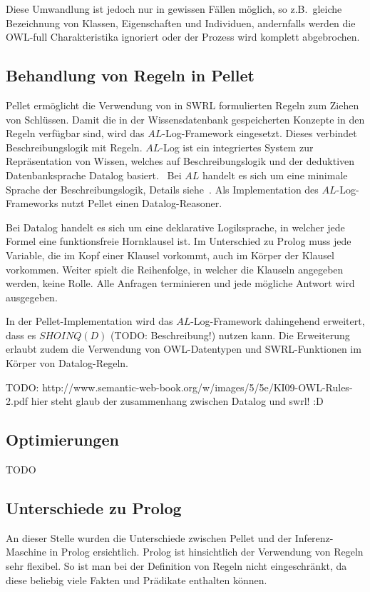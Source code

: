 Diese Umwandlung ist jedoch nur in gewissen Fällen möglich, so z.B.\ gleiche Bezeichnung von Klassen, Eigenschaften und Individuen, andernfalls werden die OWL-full Charakteristika ignoriert oder der Prozess wird komplett abgebrochen.

\subsection{Behandlung von Regeln in Pellet}
\label{subsection:inferenz_pellet_swrl}
Pellet ermöglicht die Verwendung von in SWRL formulierten Regeln zum Ziehen von Schlüssen. Damit die in der Wissensdatenbank gespeicherten Konzepte in den Regeln verfügbar sind, wird das $AL$-Log-Framework eingesetzt. Dieses verbindet Beschreibungslogik mit Regeln. $AL$-Log ist ein integriertes System zur Repräsentation von Wissen, welches auf Beschreibungslogik und der deduktiven Datenbanksprache Datalog basiert.~\cite{allog} Bei $AL$ handelt es sich um eine minimale Sprache der Beschreibungslogik, Details siehe~\cite[Seite 51]{dl:baader2003}. Als Implementation des $AL$-Log-Frameworks nutzt Pellet einen Datalog-Reasoner. 

Bei Datalog handelt es sich um eine deklarative Logiksprache, in welcher jede Formel eine funktionsfreie Hornklausel ist. Im Unterschied zu Prolog muss jede Variable, die im Kopf einer Klausel vorkommt, auch im Körper der Klausel vorkommen. Weiter spielt die Reihenfolge, in welcher die Klauseln angegeben werden, keine Rolle. Alle Anfragen terminieren und jede mögliche Antwort wird ausgegeben.~\cite{datalog}

In der Pellet-Implementation wird das $AL$-Log-Framework dahingehend erweitert, dass es $SHOINQ(D)$ (TODO: Beschreibung!) nutzen kann. Die Erweiterung erlaubt zudem die Verwendung von OWL-Datentypen und SWRL-Funktionen im Körper von Datalog-Regeln.

TODO: http://www.semantic-web-book.org/w/images/5/5e/KI09-OWL-Rules-2.pdf hier steht glaub der zusammenhang zwischen Datalog und swrl! :D

\subsection{Optimierungen}
\label{subsection:inferenz_pellet_opti}
TODO

\subsection{Unterschiede zu Prolog}
\label{}
An dieser Stelle wurden die Unterschiede zwischen Pellet und der Inferenz-Maschine in Prolog ersichtlich. Prolog ist hinsichtlich der Verwendung von Regeln sehr flexibel. So ist man bei der Definition von Regeln nicht eingeschränkt, da diese beliebig viele Fakten und Prädikate enthalten können.

